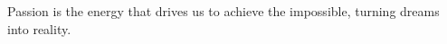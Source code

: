 \documentclass[preview]{standalone}
\begin{document}
\begin{center}
Passion is the energy that drives us to achieve the impossible, turning dreams into reality.
\end{center}
\end{document}

